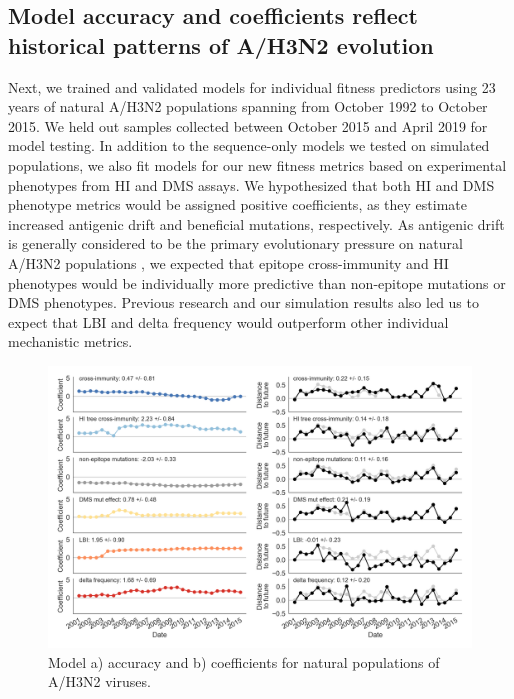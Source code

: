 \subsection*{Model accuracy and coefficients reflect historical patterns of A/H3N2 evolution}

Next, we trained and validated models for individual fitness predictors using 23 years of natural A/H3N2 populations spanning from October 1992 to October 2015.
We held out samples collected between October 2015 and April 2019 for model testing.
In addition to the sequence-only models we tested on simulated populations, we also fit models for our new fitness metrics based on experimental phenotypes from HI and DMS assays.
We hypothesized that both HI and DMS phenotype metrics would be assigned positive coefficients, as they estimate increased antigenic drift and beneficial mutations, respectively.
As antigenic drift is generally considered to be the primary evolutionary pressure on natural A/H3N2 populations \cite{Smith:2004jc,Bedford:2014bf,Luksza:2014hj}, we expected that epitope cross-immunity and HI phenotypes would be individually more predictive than non-epitope mutations or DMS phenotypes.
Previous research \cite{Neher:2016hy} and our simulation results also led us to expect that LBI and delta frequency would outperform other individual mechanistic metrics.

\begin{figure}[t]
  \begin{center}
  \includegraphics[width=\textwidth]{figures/unadjusted-model-accuracy-and-coefficients-for-natural-populations.png}
  \caption{Model a) accuracy and b) coefficients for natural populations of A/H3N2 viruses.}
  \label{fig:unadjusted_model_accuracy_and_coefficients_for_natural_populations}
  \end{center}
\end{figure}

